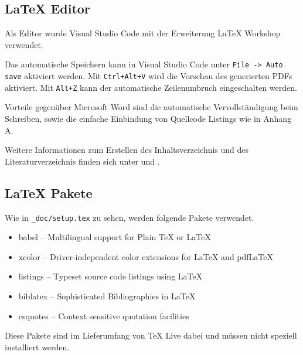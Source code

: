 \subsection{LaTeX Editor}
Als Editor wurde Visual Studio Code \cite{vscode} mit der Erweiterung LaTeX Workshop \cite{latexWorkshop} verwendet.

Das automatische Speichern kann in Visual Studio Code unter \verb|File -> Auto save| aktiviert werden. Mit \verb|Ctrl+Alt+V| wird die Vorschau des generierten PDFs aktiviert. Mit \verb|Alt+Z| kann der automatische Zeilenumbruch eingeschalten werden.

Vorteile gegenüber Microsoft Word sind die automatische Vervollständigung beim Schreiben, sowie die einfache Einbindung von Quellcode Listings wie in Anhang A.

Weitere Informationen zum Erstellen des Inhaltsverzeichnis und des Literaturverzeichnis finden sich unter \cite{inhaltsverzeichnis} und \cite{literaturverzeichnis}.

\subsection{LaTeX Pakete}
Wie in \verb|_doc/setup.tex| zu sehen, werden folgende Pakete verwendet.
\begin{itemize}
    \item babel -- Multilingual support for Plain TeX or LaTeX
    \item xcolor -- Driver-independent color extensions for LaTeX and pdfLaTeX
    \item listings -- Typeset source code listings using LaTeX
    \item biblatex -- Sophisticated Bibliographies in LaTeX
    \item csquotes -- Context sensitive quotation facilities
\end{itemize}
Diese Pakete sind im Lieferumfang von TeX Live dabei und müssen nicht speziell installiert werden.